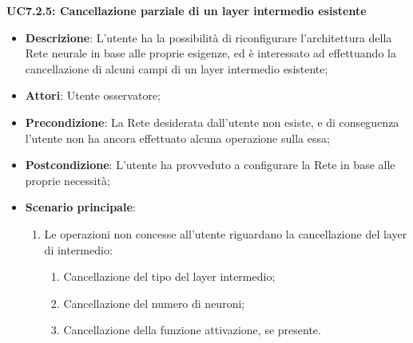 \textbf{UC7.2.5: Cancellazione parziale di un layer intermedio esistente}
\label{UC7.2.5: Cancellazione parziale di un layer intermedio esistente}
\noindent
\begin{itemize}
\item \textbf{Descrizione}: L'utente ha la possibilit\`a di riconfigurare l'architettura della Rete neurale in base alle proprie esigenze, ed \`e interessato ad effettuando la cancellazione di alcuni campi di un layer intermedio esistente;
\item \textbf{Attori}: Utente osservatore;
\item \textbf{Precondizione}: La Rete desiderata dall'utente non esiste, e di conseguenza l'utente non ha ancora effettuato alcuna operazione sulla essa;
\item \textbf{Postcondizione}: L'utente ha provveduto a configurare la Rete in base alle proprie necessit\`a;
\item \textbf{Scenario principale}:
\begin{enumerate}
\item Le operazioni non concesse all'utente riguardano la cancellazione del layer di intermedio:
\begin{enumerate}
\item Cancellazione del tipo del layer intermedio;
\item Cancellazione del numero di neuroni;
\item Cancellazione della funzione attivazione, se presente.
\end{enumerate}
\end{enumerate}
\end{itemize}


